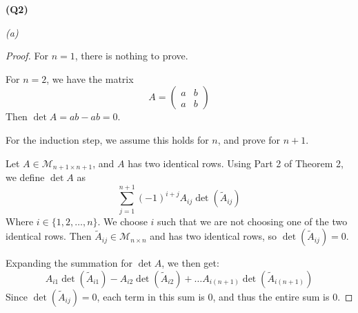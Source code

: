 \documentclass[12pt, a4paper]{article}
\begin{document}
\textbf{(Q2)}

\textit{(a)}
\begin{proof}
    For $n = 1$, there is nothing to prove.

    For $n = 2$, we have the matrix
    \[
        A = \begin{pmatrix}
            a & b\\
            a & b
        \end{pmatrix}
    \]
    Then $\det A = ab - ab = 0$.
    
    For the induction step, we assume this holds for $n$, and prove
    for $n + 1$.

    Let $A \in \mathcal{M}_{n + 1 \times n + 1}$, and $A$ has two
    identical rows. Using Part 2 of Theorem 2, we define $\det A$ as
    \[
        \sum_{j = 1}^{n + 1}(-1)^{i + j}A_{ij}
        \det\left(\tilde{A}_{ij}\right)
    \]
    Where $i \in \{1, 2, \ldots, n\}$. We choose $i$ such that we are not
    choosing one of the two identical rows.
    Then $\tilde{A}_{ij} \in \mathcal{M}_{n \times n}$ and has two
    identical rows, so $\det (\tilde{A}_{ij}) = 0$.

    Expanding the summation for $\det A$, we then get:
    \[
        A_{i1}\det(\tilde{A}_{i1}) - A_{i2}\det(\tilde{A}_{i2}) + \ldots
        A_{i(n + 1)}\det(\tilde{A}_{i(n+1)})
    \]
    Since $\det (\tilde{A}_{ij}) = 0$, each term in this sum is 0,
    and thus the entire sum is 0.
\end{proof}
\end{document}
